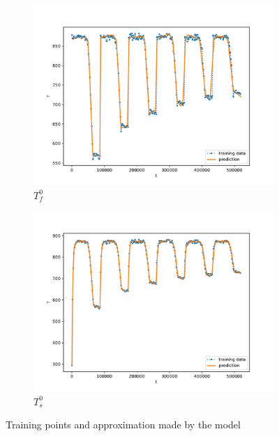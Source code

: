\documentclass[a4paper]{article}
\begin{document}
\begin{figure}[b]
	\begin{subfigure}[b]{0.5\textwidth}
	  \centering
	  \includegraphics[width=\linewidth]{figures/task1/final_tf0.pdf}
	  \caption{$T_f^0$}
	  \label{fig:task1a}
	\end{subfigure}
	\begin{subfigure}[b]{0.5\textwidth}
	  \centering
	  \includegraphics[width=\linewidth]{figures/task1/final_ts0.pdf}
	  \caption{$T_s^0$}
	  \label{fig:task1b}
	\end{subfigure}
	\caption{Training points and approximation made by the model}
	\label{fig:task1}
  \end{figure}
\end{document}
